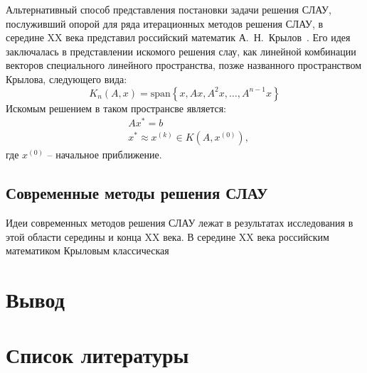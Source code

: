 Альтернативный способ представления постановки задачи решения СЛАУ, послуживший опорой для ряда итерационных методов решения СЛАУ, в середине XX века представил российский математик А.~Н.~Крылов~\cite{w:krylov}. Его идея заключалась в представлении искомого решения слау, как линейной комбинации векторов специального линейного пространства, позже названного пространством Крылова, следующего вида:
\[
	K_n(A, x) = \mathrm{span}\left\{x, Ax, A^2x, \dots, A^{n-1}x\right\}
\]
Искомым решением в таком пространсве является:
\begin{align*}
	&Ax^* = b\\
	&x^* \approx x^{(k)} \in K(A, x^{(0)}),
\end{align*}
где $x^{(0)}$ -- начальное приближение.

\subsection{Современные методы решения СЛАУ}
Идеи современных методов решения СЛАУ лежат в результатах исследования в этой области середины и конца XX века. В середине XX века российским математиком Крыловым классическая


\section{Вывод}


\nocite{*}
\section*{Список литературы}
\printbibliography[heading=none]
